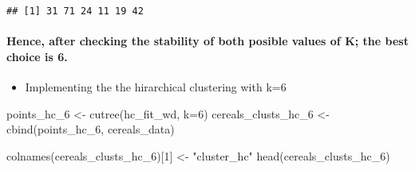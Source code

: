 \documentclass[
]{article}
\newenvironment{Shaded}{\begin{snugshade}}{\end{snugshade}}
\newcommand{\AttributeTok}[1]{\textcolor[rgb]{0.77,0.63,0.00}{#1}}
\newcommand{\CommentTok}[1]{\textcolor[rgb]{0.56,0.35,0.01}{\textit{#1}}}
\newcommand{\DecValTok}[1]{\textcolor[rgb]{0.00,0.00,0.81}{#1}}
\newcommand{\FunctionTok}[1]{\textcolor[rgb]{0.00,0.00,0.00}{#1}}
\newcommand{\NormalTok}[1]{#1}
\newcommand{\OtherTok}[1]{\textcolor[rgb]{0.56,0.35,0.01}{#1}}
\newcommand{\SpecialCharTok}[1]{\textcolor[rgb]{0.00,0.00,0.00}{#1}}
\newcommand{\StringTok}[1]{\textcolor[rgb]{0.31,0.60,0.02}{#1}}
\providecommand{\tightlist}{%
  \setlength{\itemsep}{0pt}\setlength{\parskip}{0pt}}
\begin{document}
\begin{Shaded}
\end{Shaded}

\begin{verbatim}
## [1] 31 71 24 11 19 42
\end{verbatim}

\hypertarget{hence-after-checking-the-stability-of-both-posible-values-of-k-the-best-choice-is-6.}{%
\paragraph{Hence, after checking the stability of both posible values of
K; the best choice is
6.}\label{hence-after-checking-the-stability-of-both-posible-values-of-k-the-best-choice-is-6.}}

\begin{itemize}
\tightlist
\item
  Implementing the the hirarchical clustering with k=6
\end{itemize}

\begin{Shaded}
\begin{Highlighting}[]
\NormalTok{points\_hc\_6 }\OtherTok{\textless{}{-}} \FunctionTok{cutree}\NormalTok{(hc\_fit\_wd, }\AttributeTok{k=}\DecValTok{6}\NormalTok{)}
\NormalTok{cereals\_clusts\_hc\_6 }\OtherTok{\textless{}{-}} \FunctionTok{cbind}\NormalTok{(points\_hc\_6, cereals\_data)}

\FunctionTok{colnames}\NormalTok{(cereals\_clusts\_hc\_6)[}\DecValTok{1}\NormalTok{] }\OtherTok{\textless{}{-}} \StringTok{"cluster\_hc"}
\FunctionTok{head}\NormalTok{(cereals\_clusts\_hc\_6)}
\end{Highlighting}
\end{Shaded}
\end{document}
